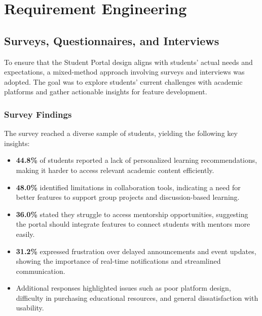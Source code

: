 
\chapter{Requirement Engineering}

\section{Surveys, Questionnaires, and Interviews}

To ensure that the Student Portal design aligns with students' actual needs and expectations, a mixed-method approach involving surveys and interviews was adopted. The goal was to explore students' current challenges with academic platforms and gather actionable insights for feature development.

\subsection*{Survey Findings}

The survey reached a diverse sample of students, yielding the following key insights:

\begin{itemize}
\item \textbf{44.8\%} of students reported a lack of personalized learning recommendations, making it harder to access relevant academic content efficiently.
\item \textbf{48.0\%} identified limitations in collaboration tools, indicating a need for better features to support group projects and discussion-based learning.
\item \textbf{36.0\%} stated they struggle to access mentorship opportunities, suggesting the portal should integrate features to connect students with mentors more easily.
\item \textbf{31.2\%} expressed frustration over delayed announcements and event updates, showing the importance of real-time notifications and streamlined communication.
\item Additional responses highlighted issues such as poor platform design, difficulty in purchasing educational resources, and general dissatisfaction with usability.
\end{itemize}

